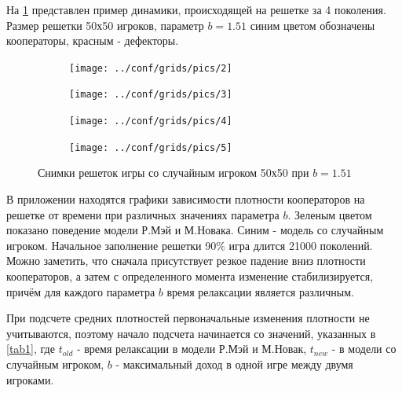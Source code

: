 \documentclass[12pt,a4paper]{article}
\begin{document}
	\par На \ref{fig:1} представлен пример динамики, происходящей на решетке за 4 поколения.
	Размер решетки 50х50 игроков, параметр $b=1.51$ синим цветом обозначены кооператоры, красным - дефекторы. 
	\begin{figure}[H]
		\centering
		\begin{subfigure}{.5\textwidth}
			\texttt{[image: ../conf/grids/pics/2]}
			\caption{}
		\end{subfigure}%
		\begin{subfigure}{.5\textwidth}
			\texttt{[image: ../conf/grids/pics/3]}
			\caption{}
		\end{subfigure}%
	
		\begin{subfigure}{.5\textwidth}
			\texttt{[image: ../conf/grids/pics/4]}
			\caption{}
		\end{subfigure}%
		\begin{subfigure}{.5\textwidth}
			\texttt{[image: ../conf/grids/pics/5]}
			\caption{}
		\end{subfigure}%
		\caption{Снимки решеток игры со случайным игроком 50х50 при $b=1.51$}
		\label{fig:1}
	\end{figure}
	
	В приложении находятся графики зависимости плотности кооператоров на решетке 
	от времени при различных значениях параметра $b$. Зеленым цветом показано поведение
	модели Р.Мэй и М.Новака. Синим - модель со случайным игроком. Начальное заполнение решетки 90$\%$ игра длится 21000 поколений. Можно заметить, что сначала присутствует резкое падение вниз плотности кооператоров, а затем с определенного момента изменение 
	стабилизируется, причём для каждого параметра $b$ время релаксации является различным.
	
	\par При подсчете средних плотностей первоначальные изменения плотности не учитываются, поэтому начало подсчета начинается со значений, указанных в \ref{tab1}, где $t_{old}$ - время релаксации в модели Р.Мэй и М.Новак,  $t_{new}$ - в модели со случайным игроком,
	$b$ - максимальный доход в одной игре между двумя игроками.
	
\end{document}

